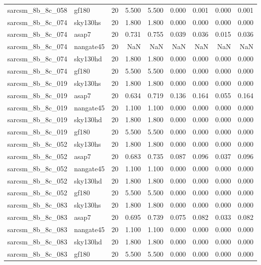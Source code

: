 \begin{tabular}{llrrrrrrr}
sarcsm\_8b\_8c\_058 & gf180 & 20 & 5.500 & 5.500 & 0.000 & 0.001 & 0.000 & 0.001 \\
sarcsm\_8b\_8c\_074 & sky130hs & 20 & 1.800 & 1.800 & 0.000 & 0.000 & 0.000 & 0.000 \\
sarcsm\_8b\_8c\_074 & asap7 & 20 & 0.731 & 0.755 & 0.039 & 0.036 & 0.015 & 0.036 \\
sarcsm\_8b\_8c\_074 & nangate45 & 20 & NaN & NaN & NaN & NaN & NaN & NaN \\
sarcsm\_8b\_8c\_074 & sky130hd & 20 & 1.800 & 1.800 & 0.000 & 0.000 & 0.000 & 0.000 \\
sarcsm\_8b\_8c\_074 & gf180 & 20 & 5.500 & 5.500 & 0.000 & 0.000 & 0.000 & 0.000 \\
sarcsm\_8b\_8c\_019 & sky130hs & 20 & 1.800 & 1.800 & 0.000 & 0.000 & 0.000 & 0.000 \\
sarcsm\_8b\_8c\_019 & asap7 & 20 & 0.634 & 0.719 & 0.136 & 0.164 & 0.055 & 0.164 \\
sarcsm\_8b\_8c\_019 & nangate45 & 20 & 1.100 & 1.100 & 0.000 & 0.000 & 0.000 & 0.000 \\
sarcsm\_8b\_8c\_019 & sky130hd & 20 & 1.800 & 1.800 & 0.000 & 0.000 & 0.000 & 0.000 \\
sarcsm\_8b\_8c\_019 & gf180 & 20 & 5.500 & 5.500 & 0.000 & 0.000 & 0.000 & 0.000 \\
sarcsm\_8b\_8c\_052 & sky130hs & 20 & 1.800 & 1.800 & 0.000 & 0.000 & 0.000 & 0.000 \\
sarcsm\_8b\_8c\_052 & asap7 & 20 & 0.683 & 0.735 & 0.087 & 0.096 & 0.037 & 0.096 \\
sarcsm\_8b\_8c\_052 & nangate45 & 20 & 1.100 & 1.100 & 0.000 & 0.000 & 0.000 & 0.000 \\
sarcsm\_8b\_8c\_052 & sky130hd & 20 & 1.800 & 1.800 & 0.000 & 0.000 & 0.000 & 0.000 \\
sarcsm\_8b\_8c\_052 & gf180 & 20 & 5.500 & 5.500 & 0.000 & 0.000 & 0.000 & 0.000 \\
sarcsm\_8b\_8c\_083 & sky130hs & 20 & 1.800 & 1.800 & 0.000 & 0.000 & 0.000 & 0.000 \\
sarcsm\_8b\_8c\_083 & asap7 & 20 & 0.695 & 0.739 & 0.075 & 0.082 & 0.033 & 0.082 \\
sarcsm\_8b\_8c\_083 & nangate45 & 20 & 1.100 & 1.100 & 0.000 & 0.000 & 0.000 & 0.000 \\
sarcsm\_8b\_8c\_083 & sky130hd & 20 & 1.800 & 1.800 & 0.000 & 0.000 & 0.000 & 0.000 \\
sarcsm\_8b\_8c\_083 & gf180 & 20 & 5.500 & 5.500 & 0.000 & 0.000 & 0.000 & 0.000 \\

\end{tabular}
